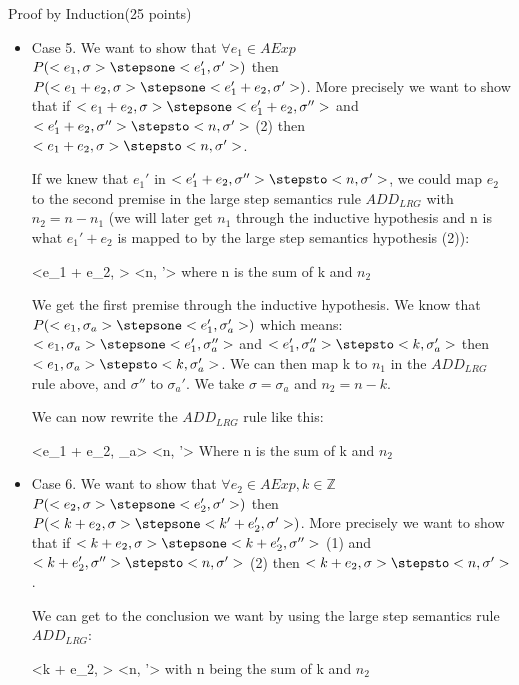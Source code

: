 \documentclass{article}
\begin{document}
\begin{question}{Proof by Induction}{(25 points)}
\begin{subquestion}
\begin{itemize}
\item Case 5. We want to show that $\forall e_1 \in AExp$ $P(<e_1, \sigma> \stepsone <e_1', \sigma'>)$ then $P(<e_1+e_2, \sigma> \stepsone <e_1'+e_2, \sigma'>)$. More precisely we want to show that if $<e_1+e_2, \sigma> \stepsone <e_1'+e_2, \sigma''>$ and $<e_1'+e_2, \sigma''> \stepsto <n, \sigma'>$ (2) then $<e_1+e_2, \sigma> \stepsto <n, \sigma'>$.

If we knew that $e_1'$ in $<e_1'+e_2, \sigma''> \stepsto <n, \sigma'>$, we could map $e_2$ to the second premise in the large step semantics rule $ADD_{LRG}$ with $n_2 = n - n_1$ (we will later get $n_1$ through the inductive hypothesis and n is what $e_1' + e_2$ is mapped to by the large step semantics hypothesis (2)):

{
	<e_1 + e_2, \sigma> \stepsto <n, \sigma'>
}
{
	where n is the sum of k and $n_2$
}

We get the first premise through the inductive hypothesis. We know that $P(<e_1, \sigma_a>  \stepsone <e_1', \sigma_a'>)$ which means: $<e_1, \sigma_a> \stepsone <e_1', \sigma_a''>$ and $<e_1', \sigma_a''> \stepsto <k, \sigma_a'>$ then $<e_1, \sigma_a> \stepsto <k, \sigma_a'>$. We can then map k to $n_1$ in the $ADD_{LRG}$ rule above, and $\sigma''$ to $\sigma_a'$. We take $\sigma = \sigma_a$ and $n_2 = n - k$.

We can now rewrite the $ADD_{LRG}$ rule like this:

{
	<e_1 + e_2, \sigma_a> \stepsto <n, \sigma'>
}
{
	Where n is the sum of k and $n_2$
}

\item Case 6. We want to show that $\forall e_2 \in AExp, k \in \mathbb{Z}$ $P(<e_2, \sigma> \stepsone <e_2', \sigma'>)$ then $P(<k+e_2, \sigma> \stepsone <k'+e_2', \sigma'>)$. More precisely we want to show that if $<k+e_2, \sigma> \stepsone <k+e_2', \sigma''>$ (1) and $<k+e_2', \sigma''> \stepsto <n, \sigma'>$ (2) then $<k+e_2, \sigma> \stepsto <n, \sigma'>$.


We can get to the conclusion we want by using the large step semantics rule $ADD_{LRG}$:

{
	<k + e_2, \sigma> \stepsto <n, \sigma'>
}
{
	with n being the sum of k and $n_2$
}


\end{itemize}
\end{subquestion}
\end{question}
\end{document}
